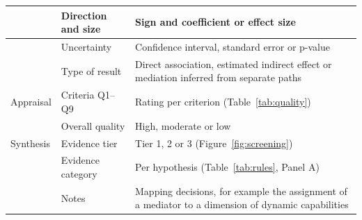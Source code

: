 \begin{table}[htbp]
\begin{tabularx}{\textwidth}{|>{\raggedright\arraybackslash}p{2.3cm}|>{\raggedright\arraybackslash}p{3.4cm}|>{\raggedright\arraybackslash}X|}
 & Direction and size & Sign and coefficient or effect size \\ \cline{2-3}
 & Uncertainty & Confidence interval, standard error or p-value \\ \cline{2-3}
 & Type of result & Direct association, estimated indirect effect or mediation inferred from separate paths \\
\hline
Appraisal & Criteria Q1--Q9 & Rating per criterion (Table~\ref{tab:quality}) \\ \cline{2-3}
 & Overall quality & High, moderate or low \\
\hline
Synthesis & Evidence tier & Tier 1, 2 or 3 (Figure~\ref{fig:screening}) \\ \cline{2-3}
 & Evidence category & Per hypothesis (Table~\ref{tab:rules}, Panel A) \\ \cline{2-3}
 & Notes & Mapping decisions, for example the assignment of a mediator to a dimension of dynamic capabilities \\
\hline
\end{tabularx}
\end{table}
